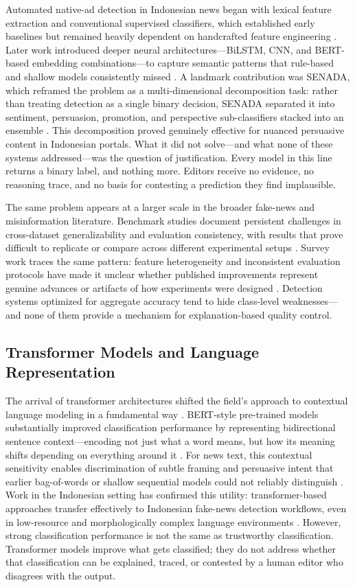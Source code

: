 \documentclass{ieeeaccess}
\begin{document}
Automated native-ad detection in Indonesian news began with lexical feature extraction and conventional supervised classifiers, which established early baselines but remained heavily dependent on handcrafted feature engineering \cite{r8}. Later work introduced deeper neural architectures—BiLSTM, CNN, and BERT-based embedding combinations—to capture semantic patterns that rule-based and shallow models consistently missed \cite{r22}. A landmark contribution was SENADA, which reframed the problem as a multi-dimensional decomposition task: rather than treating detection as a single binary decision, SENADA separated it into sentiment, persuasion, promotion, and perspective sub-classifiers stacked into an ensemble \cite{r6}. This decomposition proved genuinely effective for nuanced persuasive content in Indonesian portals. What it did not solve—and what none of these systems addressed—was the question of justification. Every model in this line returns a binary label, and nothing more. Editors receive no evidence, no reasoning trace, and no basis for contesting a prediction they find implausible.

The same problem appears at a larger scale in the broader fake-news and misinformation literature. Benchmark studies document persistent challenges in cross-dataset generalizability and evaluation consistency, with results that prove difficult to replicate or compare across different experimental setups \cite{r14}. Survey work traces the same pattern: feature heterogeneity and inconsistent evaluation protocols have made it unclear whether published improvements represent genuine advances or artifacts of how experiments were designed \cite{r15}. Detection systems optimized for aggregate accuracy tend to hide class-level weaknesses—and none of them provide a mechanism for explanation-based quality control.

\subsection{Transformer Models and Language Representation}

The arrival of transformer architectures shifted the field's approach to contextual language modeling in a fundamental way \cite{r26}. BERT-style pre-trained models substantially improved classification performance by representing bidirectional sentence context—encoding not just what a word means, but how its meaning shifts depending on everything around it \cite{r27}. For news text, this contextual sensitivity enables discrimination of subtle framing and persuasive intent that earlier bag-of-words or shallow sequential models could not reliably distinguish \cite{r27}. Work in the Indonesian setting has confirmed this utility: transformer-based approaches transfer effectively to Indonesian fake-news detection workflows, even in low-resource and morphologically complex language environments \cite{r28}. However, strong classification performance is not the same as trustworthy classification. Transformer models improve what gets classified; they do not address whether that classification can be explained, traced, or contested by a human editor who disagrees with the output.
\end{document}
